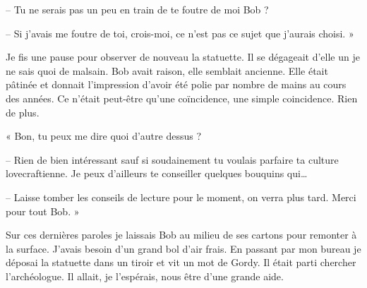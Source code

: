 -- Tu ne serais pas un peu en train de te foutre de moi Bob ?

-- Si j'avais me foutre de toi, crois-moi, ce n'est pas ce sujet que j'aurais choisi. »

Je fis une pause pour observer de nouveau la statuette. Il se dégageait d'elle un je ne sais quoi de malsain. Bob avait 
raison, elle semblait ancienne. Elle était pâtinée et donnait l'impression d'avoir été polie par nombre de mains au 
cours des années. Ce n'était peut-être qu'une coïncidence, une simple coincidence. Rien de plus.

« Bon, tu peux me dire quoi d'autre dessus ?

-- Rien de bien intéressant sauf si soudainement tu voulais parfaire ta culture lovecraftienne. Je peux d'ailleurs te 
conseiller quelques bouquins qui\ldots{}

-- Laisse tomber les conseils de lecture pour le moment, on verra plus tard. Merci pour tout Bob. »

Sur ces dernières paroles je laissais Bob au milieu de ses cartons pour remonter à la surface. J'avais besoin d'un grand
bol d'air frais. En passant par mon bureau je déposai la statuette dans un tiroir et vit un mot de Gordy. Il était parti
chercher l'archéologue. Il allait, je l'espérais, nous être d'une grande aide.
